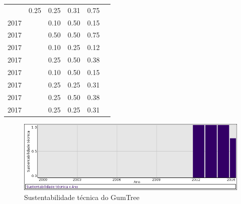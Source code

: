 \begin{table}[H]
\begin{tabular}{| l | c | c | c | c | c |}
          &
          0.25
          &
          0.25
          &
          0.31
          &
            {\color{blue} 0.75}
          \\
            2017
          &
          
          &
          0.10
          &
          0.50
          &
          0.15
          &
          \\
            2017
          &
          
          &
          0.50
          &
          0.50
          &
          0.75
          &
          \\
            2017
          &
          
          &
          0.10
          &
          0.25
          &
          0.12
          &
          \\
            2017
          &
          
          &
          0.25
          &
          0.50
          &
          0.38
          &
          \\
            2017
          &
          
          &
          0.10
          &
          0.50
          &
          0.15
          &
          \\
            2017
          &
          
          &
          0.25
          &
          0.25
          &
          0.31
          &
          \\
            2017
          &
          
          &
          0.25
          &
          0.50
          &
          0.38
          &
          \\
            2017
          &
          
          &
          0.25
          &
          0.25
          &
          0.31
          &
          \\
\hline
\end{tabular}
\end{table}

\begin{figure}[h]
  \center
  \includegraphics[scale=0.50]{result-documents/charts/gumtree.png}
  \caption{Sustentabilidade técnica do GumTree}
\end{figure}



